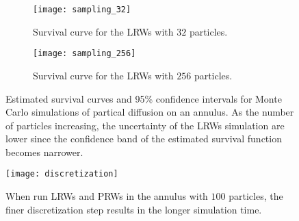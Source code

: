 \begin{figure}
  \begin{subfigure}{0.9\textwidth}
    \centering
    \texttt{[image: sampling\_32]}
    \caption{Survival curve for the LRWs with $32$ particles.\label{fig:annulus_32_particles}}
  \end{subfigure}
  \begin{subfigure}{0.9\textwidth}
    \centering
    \texttt{[image: sampling\_256]}
    \caption{Survival curve for the LRWs with $256$ particles. \label{fig:annulus_256_particles}}
  \end{subfigure}
  \caption{Estimated survival curves and 95\% confidence intervals for
    Monte Carlo simulations of partical diffusion on an annulus. As
    the number of particles increasing, the uncertainty of the LRWs
    simulation are lower since the confidence band of the estimated
    survival function becomes narrower.\label{fig:lrw_prw_annulus}}
\end{figure}



\begin{figure}
  \centering
  \texttt{[image: discretization]}
  \caption{When run LRWs and PRWs in the annulus with $100$ particles,
    the finer discretization step results in the longer simulation
    time.\label{fig:annulus_finer_steps}}
\end{figure}
